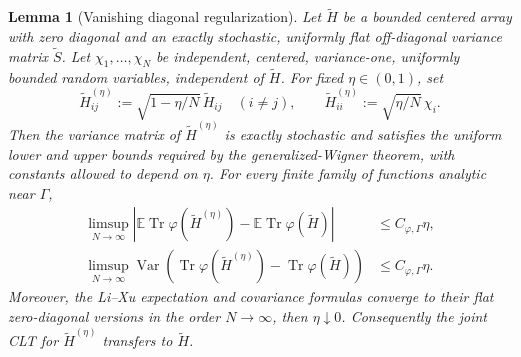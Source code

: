 \documentclass[10pt,a4paper]{amsart}
\newtheorem{lemma}[theorem]{Lemma}
\newcommand{\E}{\mathbb E}
\newcommand{\Var}{\operatorname{Var}}
\newcommand{\Tr}{\operatorname{Tr}}
\begin{document}
\begin{lemma}[Vanishing diagonal regularization]
\label{lem:R3-diagonal-regularization}
Let \(\widetilde H\) be a bounded centered array with zero diagonal and an
exactly stochastic, uniformly flat off-diagonal variance matrix
\(\widetilde S\).  Let \(\chi_1,\ldots,\chi_N\) be independent, centered,
variance-one, uniformly bounded random variables, independent of
\(\widetilde H\).  For fixed \(\eta\in(0,1)\), set
\begin{equation}\label{eq:R3-eta-matrix}
 \widetilde H^{(\eta)}_{ij}
 :=\sqrt{1-\eta/N}\,\widetilde H_{ij}\quad(i\ne j),
 \qquad
 \widetilde H^{(\eta)}_{ii}:=\sqrt{\eta/N}\,\chi_i.
\end{equation}
Then the variance matrix of \(\widetilde H^{(\eta)}\) is exactly stochastic
and satisfies the uniform lower and upper bounds required by the
generalized-Wigner theorem, with constants allowed to depend on \(\eta\).
For every finite family of functions analytic near \(\Gamma\),
\begin{align}
 \limsup_{N\to\infty}\left|
 \E\Tr\varphi(\widetilde H^{(\eta)})
 -\E\Tr\varphi(\widetilde H)
 \right|&\le C_{\varphi,\Gamma}\eta,
 \label{eq:R3-eta-mean}\\
 \limsup_{N\to\infty}\Var\!\left(
 \Tr\varphi(\widetilde H^{(\eta)})
 -\Tr\varphi(\widetilde H)
 \right)&\le C_{\varphi,\Gamma}\eta.
 \label{eq:R3-eta-L2}
\end{align}
Moreover, the Li--Xu expectation and covariance formulas converge to their flat
zero-diagonal versions in the order \(N\to\infty\), then
\(\eta\downarrow0\).  Consequently the joint CLT for
\(\widetilde H^{(\eta)}\) transfers to \(\widetilde H\).
\end{lemma}
\end{document}
